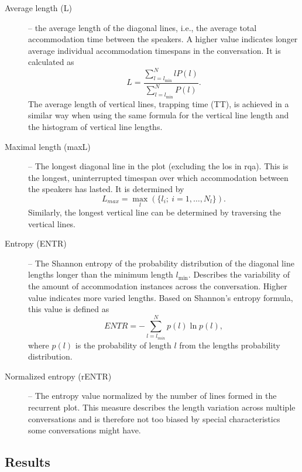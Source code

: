 \begin{description}
	\item[Average length (L)] -- the average length of the diagonal lines, i.e., the average total accommodation time between the speakers.
	A higher value indicates longer average individual accommodation timespans in the conversation.
	It is calculated as
	\begin{equation}
		\label{eq:l}
		L = \frac{\sum_{l=l_{\min}}^N l P(l)}{\sum_{l=l_{\min}}^N P(l)}.
	\end{equation}
	The average length of vertical lines, trapping time (TT), is achieved in a similar way when using the same formula for the vertical line length and the histogram of vertical line lengths.
	
	\item[Maximal length (maxL)] -- The longest diagonal line in the plot (excluding the \ac{los} in \ac{rqa}).	
	This is the longest, uninterrupted timespan over which accommodation between the speakers has lasted.
	It is determined by
	\begin{equation}
		\label{eq:maxl}
		L_{max} = \max_{l} (\{l_i; \ i=1, \ldots, N_l\}).
	\end{equation}
	Similarly, the longest vertical line can be determined by traversing the vertical lines.
	
	\item[Entropy (ENTR)] -- The Shannon entropy of the probability distribution of the diagonal line lengths longer than the minimum length $l_{\min}$.
	Describes the variability of the amount of accommodation instances across the conversation.
	Higher value indicates more varied lengths.
	Based on Shannon's entropy formula, this value is defined as
	\begin{equation}
		\label{eq:entr}
		ENTR = -\sum_{l=l_{min}}^{N} p(l) \ln p(l),
	\end{equation}
	where $p(l)$ is the probability of length $l$ from the lengths probability distribution.
	\item[Normalized entropy (rENTR)] -- The entropy value normalized by the number of lines formed in the recurrent plot.
	This measure describes the length variation across multiple conversations and is therefore not too biased by special characteristics some conversations might have.
\end{description}
%

\subsection{Results}
\label{subsec:results_hhi}

